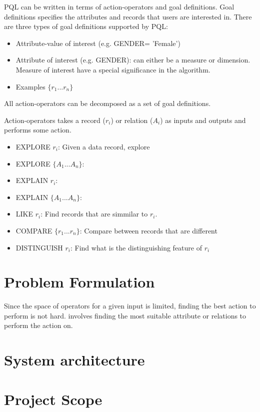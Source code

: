 \documentclass{sig-alternate-05-2015}
\begin{document}
PQL can be written in terms of action-operators and goal definitions. Goal definitions specifies the attributes and records that users are interested in. There are three types of goal definitions supported by PQL: 
\begin{itemize}
	\item Attribute-value of interest (e.g. GENDER= 'Female')
	\item Attribute of interest (e.g. GENDER): can either be a measure or dimension. Measure of interest have a special significance in the algorithm.
	\item Examples $\{r_1 ...r_n\}$
\end{itemize}
 All action-operators can be decomposed as a set of goal definitions. 



Action-operators takes a record ($r_i$) or relation ($A_i$) as inputs and outputs and performs some action. 
\begin{itemize}
	\item EXPLORE $r_i$: Given a data record, explore  
	\item EXPLORE $\{A_1 ...A_n\}$: 
	\item EXPLAIN $r_i$: 
	\item EXPLAIN $\{A_1 ...A_n\}$:
	\item LIKE $r_i$: Find records that are simmilar to $r_i$.
	\item COMPARE $\{r_1 ...r_n\}$: Compare between records that are different 
	\item DISTINGUISH $r_i$: Find what is the distinguishing feature of $r_i$ 
\end{itemize}


\section{Problem Formulation}
Since the space of operators for a given input is limited, finding the best action to perform is not hard. 
 involves finding the most suitable attribute or relations to perform the action on.
\section{System architecture}

\section{Project Scope}


  
\end{document}
